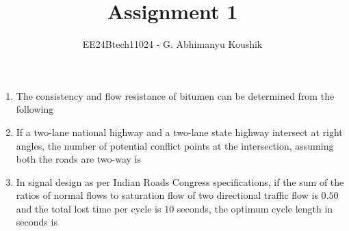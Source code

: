 \documentclass[journal,12pt,onecolumn]{IEEEtran}
\theoremstyle{remark}
\begin{document}
\title{Assignment 1}
\author{EE24Btech11024 - G. Abhimanyu Koushik}
\maketitle
\renewcommand{\thefigure}{\theenumi}
\renewcommand{\thetable}{\theenumi}
\begin{enumerate}

\item The consistency and flow resistance of bitumen can be determined from the following

\hfill{}
\begin{enumerate}
\end{enumerate}

\item If a two-lane national highway and a two-lane state highway intersect at right angles, the number of potential conflict points at the intersection, assuming both the roads are two-way is

\hfill{}
\begin{enumerate}
\end{enumerate}

\item In signal design as per Indian Roads Congress specifications, if the sum of the ratios of normal flows to saturation flow of two directional traffic flow is $0.50$ and the total lost time per cycle is $10$ seconds, the optimum cycle length in seconds is

\hfill{}
\begin{enumerate}
\end{enumerate}


\end{enumerate}
\end{document}
